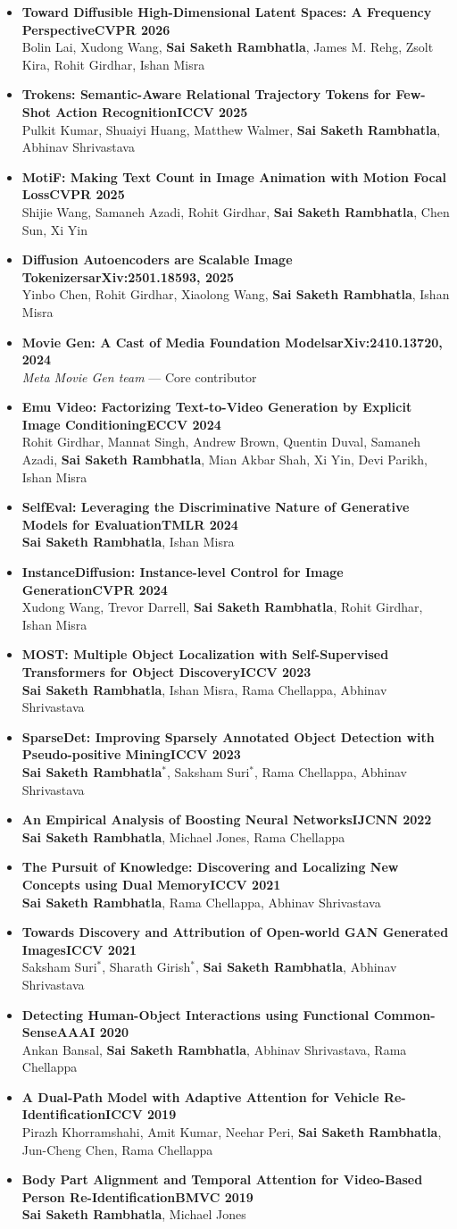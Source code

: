 \documentclass[10pt, letterpaper]{article}
\newcommand{\pub}[3]{\item\begin{minipage}[t]{\linewidth}\textbf{#1}\hfill{\small\color{accent}\bfseries #3}\\{\small #2}\end{minipage}}
\newcommand{\me}{\textbf{Sai Saketh Rambhatla}}
\begin{document}
\begin{itemize}[leftmargin=0.4cm, topsep=0pt, itemsep=3pt, label={\color{accent}\small$\blacktriangleright$}]
\pub{Toward Diffusible High-Dimensional Latent Spaces: A Frequency Perspective}{Bolin Lai, Xudong Wang, \me, James M. Rehg, Zsolt Kira, Rohit Girdhar, Ishan Misra}{CVPR 2026}
\pub{Trokens: Semantic-Aware Relational Trajectory Tokens for Few-Shot Action Recognition}{Pulkit Kumar, Shuaiyi Huang, Matthew Walmer, \me, Abhinav Shrivastava}{ICCV 2025}
\pub{MotiF: Making Text Count in Image Animation with Motion Focal Loss}{Shijie Wang, Samaneh Azadi, Rohit Girdhar, \me, Chen Sun, Xi Yin}{CVPR 2025}
\pub{Diffusion Autoencoders are Scalable Image Tokenizers}{Yinbo Chen, Rohit Girdhar, Xiaolong Wang, \me, Ishan Misra}{arXiv:2501.18593, 2025}
\pub{Movie Gen: A Cast of Media Foundation Models}{\textit{Meta Movie Gen team} --- Core contributor}{arXiv:2410.13720, 2024}
\pub{Emu Video: Factorizing Text-to-Video Generation by Explicit Image Conditioning}{Rohit Girdhar, Mannat Singh, Andrew Brown, Quentin Duval, Samaneh Azadi, \me, Mian Akbar Shah, Xi Yin, Devi Parikh, Ishan Misra}{ECCV 2024}
\pub{SelfEval: Leveraging the Discriminative Nature of Generative Models for Evaluation}{\me, Ishan Misra}{TMLR 2024}
\pub{InstanceDiffusion: Instance-level Control for Image Generation}{Xudong Wang, Trevor Darrell, \me, Rohit Girdhar, Ishan Misra}{CVPR 2024}
\pub{MOST: Multiple Object Localization with Self-Supervised Transformers for Object Discovery}{\me, Ishan Misra, Rama Chellappa, Abhinav Shrivastava}{ICCV 2023}
\pub{SparseDet: Improving Sparsely Annotated Object Detection with Pseudo-positive Mining}{\me$^{*}$, Saksham Suri$^{*}$, Rama Chellappa, Abhinav Shrivastava}{ICCV 2023}
\pub{An Empirical Analysis of Boosting Neural Networks}{\me, Michael Jones, Rama Chellappa}{IJCNN 2022}
\pub{The Pursuit of Knowledge: Discovering and Localizing New Concepts using Dual Memory}{\me, Rama Chellappa, Abhinav Shrivastava}{ICCV 2021}
\pub{Towards Discovery and Attribution of Open-world GAN Generated Images}{Saksham Suri$^{*}$, Sharath Girish$^{*}$, \me, Abhinav Shrivastava}{ICCV 2021}
\pub{Detecting Human-Object Interactions using Functional Common-Sense}{Ankan Bansal, \me, Abhinav Shrivastava, Rama Chellappa}{AAAI 2020}
\pub{A Dual-Path Model with Adaptive Attention for Vehicle Re-Identification}{Pirazh Khorramshahi, Amit Kumar, Neehar Peri, \me, Jun-Cheng Chen, Rama Chellappa}{ICCV 2019}
\pub{Body Part Alignment and Temporal Attention for Video-Based Person Re-Identification}{\me, Michael Jones}{BMVC 2019}
\end{itemize}
\end{document}

